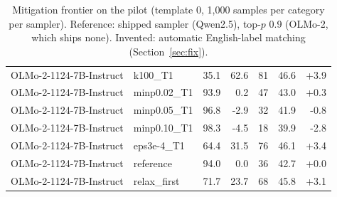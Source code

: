 \begin{table}[t]
{\begin{tabular}{llrrrrr}
OLMo-2-1124-7B-Instruct & k100\_T1 & 35.1 & 62.6 & 81 & 46.6 & +3.9 \\
OLMo-2-1124-7B-Instruct & minp0.02\_T1 & 93.9 & 0.2 & 47 & 43.0 & +0.3 \\
OLMo-2-1124-7B-Instruct & minp0.05\_T1 & 96.8 & -2.9 & 32 & 41.9 & -0.8 \\
OLMo-2-1124-7B-Instruct & minp0.10\_T1 & 98.3 & -4.5 & 18 & 39.9 & -2.8 \\
OLMo-2-1124-7B-Instruct & eps3e-4\_T1 & 64.4 & 31.5 & 76 & 46.1 & +3.4 \\
OLMo-2-1124-7B-Instruct & reference & 94.0 & 0.0 & 36 & 42.7 & +0.0 \\
OLMo-2-1124-7B-Instruct & relax\_first & 71.7 & 23.7 & 68 & 45.8 & +3.1 \\
\bottomrule
\end{tabular}}
\caption{Mitigation frontier on the pilot (template 0, 1{,}000 samples per category per sampler). Reference: shipped sampler (Qwen2.5), top-$p$ 0.9 (OLMo-2, which ships none). Invented: automatic English-label matching (Section~\ref{sec:fix}).}
\label{tab:frontier}\end{table}
